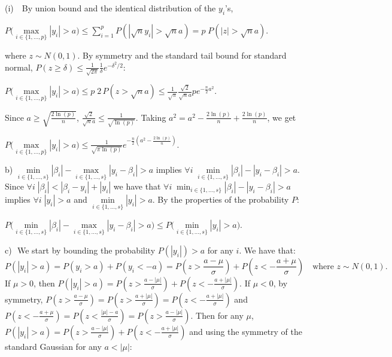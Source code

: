 \documentclass[aos]{imsart}
\theoremstyle{plain}
\begin{document}
	(i) \,\, By union bound and the identical distribution of the $y_i$'s,
\begin{center}
    $P\Big(\underset{i\in\{1,\ldots,p\}}{\max}|y_i|> a \Big)     \leq \sum_{i=1}^{p}{ P\left(|\sqrt{n}y_i|>\sqrt{n}a \right)}
    = p\; P\left(|z|>\sqrt{n}a\right).$
\end{center}
    where $z\sim N(0,1)$. 
    By symmetry and the standard tail bound for standard normal, $P(z \geq \delta) \leq \frac{1}{\sqrt{2\pi}} \frac{1}{\delta} e^{-\delta^{2} / 2}$:
\begin{center}
  $P\Big(\underset{i\in\{1,\ldots,p\}}{\max}|y_i|> a \Big) 
     \leq  p\; 2 \, P\left(z>\sqrt{n}a\right) \leq \frac{1}{\sqrt{\pi}}\frac{\sqrt{2}}{\sqrt{n}a}p e^{-\frac{n}{2} a^{2}}.$
\end{center}
Since $a \geq \sqrt{\frac{2\ln(p)}{n}}$, $\frac{\sqrt{2}}{\sqrt{n}a}\leq \frac{1}{\sqrt{\ln(p)}}$. Taking $a^2=a^2-\frac{2\ln(p)}{n}+\frac{2\ln(p)}{n}$, we get \begin{center}
$ P\Big(\underset{i\in\{1,\ldots,p\}}{\max}|y_i|> a \Big) \leq \frac{1}{\sqrt{\pi\ln(p)}} e^{-\frac{n}{2} \left(a^{2}-\frac{2\ln(p)}{n}\right)}.$ \\\end{center}
b) $ \underset{i \in \{1,\ldots,s\}}{\min}|\beta_i|- \underset{i \in \{1,\ldots,s\}}{\max}|y_i-\beta_i| > a$ implies $\forall i \; \underset{i \in \{1,\ldots,s\}}{\min}|\beta_i| - |y_i-\beta_i| > a $. Since $\forall i \; |\beta_i|< |\beta_i-y_i|+|y_i|$ we have that $ \forall i \; \min_{i \in \{1,\ldots,s\}}|\beta_i| - |y_i-\beta_i| > a$ implies $\forall i \; |y_i| > a $ and $ \underset{i \in \{1,\ldots,s\}}{\min}|y_i| > a$. By the properties of the probability $P$: 
\begin{center}$ P\Big(\underset{i \in \{1,\ldots,s\}}{\min}|\beta_i|-\underset{i \in \{1,\ldots,s\}}{\max}|y_i-\beta_i| > a\Big) \leq P\Big(\underset{i \in \{1,\ldots,s\}}{\min}|y_i| > a\Big) $. \end{center}
c)\,\, We start by bounding the probability $P(|y_i|)>a$ for any $i$. We have that:
$$P(|y_i|>a) = P(y_i>a) + P(y_i<-a) = P(z>\frac{a-\mu}{\sigma}) + P(z<-\frac{a+\mu}{\sigma}) \quad \text{where }z\sim N(0,1).$$
If $\mu>0$, then $P(|y_i|>a) =  P(z>\frac{a-|\mu|}{\sigma}) + P(z<-\frac{a+|\mu|}{\sigma})$. If $\mu<0$, by symmetry, $P(z>\frac{a-\mu}{\sigma})=P(z>\frac{a+|\mu|}{\sigma})=P(z<-\frac{a+|\mu|}{\sigma})$ and $P(z<-\frac{a+\mu}{\sigma})=P(z<\frac{|\mu|-a}{\sigma})=P(z>\frac{a-|\mu|}{\sigma})$. Then for any $\mu$, $P(|y_i|>a)  = P(z>\frac{a-|\mu|}{\sigma}) + P(z<-\frac{a+|\mu|}{\sigma}) $ and using the symmetry of the standard Gaussian for any $a<|\mu|$: 
\end{document}

